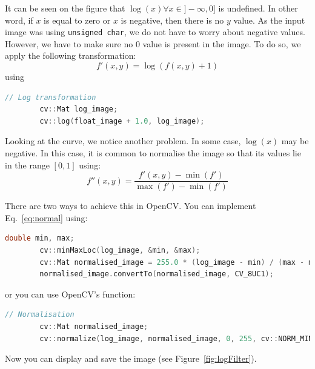 \documentclass[english,a4paper,12pt,oneside]{article}
\begin{document}
It can be seen on the figure that $\log(x) \forall x \in ]-\infty,  0]$ is undefined. 
In other word, if $x$ is equal to zero or $x$ is negative, then there is no $y$ value. 
As the input image was using \verb+unsigned char+, we do not have to worry about negative values. 
However, we have to make sure no $0$ value is present in the image. 
To do so, we apply the following transformation:
\begin{equation}f'(x,y) = \log(f(x,y) + 1)\end{equation}
using
\begin{lstlisting}[language=c++]
        // Log transformation
        cv::Mat log_image;
        cv::log(float_image + 1.0, log_image);
\end{lstlisting}

Looking at the curve, we notice another problem. 
In some case, $\log(x)$ may be negative. 
In this case, it is common to normalise the image so that its values lie in the range $[0, 1]$ using:
\begin{equation}f''(x,y) = \frac{f'(x,y) - \min(f')}{\max(f') - \min(f')}\label{eq:normal}\end{equation}

There are two ways to achieve this in OpenCV.
You can implement Eq.~\ref{eq:normal} using:
\begin{lstlisting}[language=c++]
        double min, max;
        cv::minMaxLoc(log_image, &min, &max);
        cv::Mat normalised_image = 255.0 * (log_image - min) / (max - min);
        normalised_image.convertTo(normalised_image, CV_8UC1);
\end{lstlisting}
or you can use OpenCV's function:
\begin{lstlisting}[language=c++]
        // Normalisation
        cv::Mat normalised_image;
        cv::normalize(log_image, normalised_image, 0, 255, cv::NORM_MINMAX, CV_8UC1);
\end{lstlisting}

Now you can display and save the image (see Figure~\ref{fig:logFilter}).
    
\end{document}
